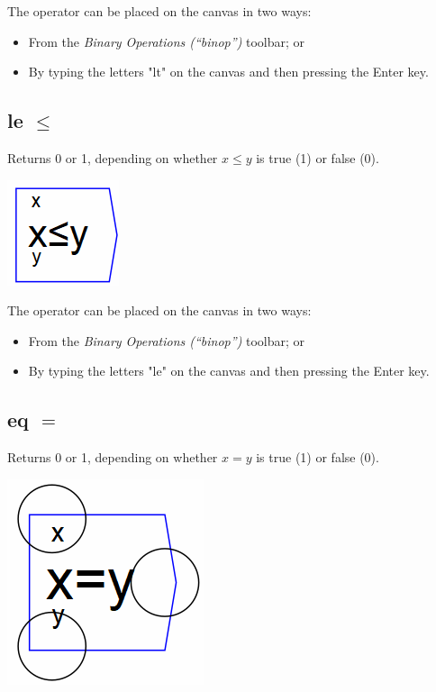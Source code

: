 The operator can be placed on the canvas in two ways:
\begin{itemize}
\item From the \emph{Binary Operations (``binop'')} toolbar; or 
\item By typing the letters "lt" on the canvas and then pressing the Enter
key. 
\end{itemize}

\subsection{le $\le$}

\label{Operation:le} Returns 0 or 1, depending on whether $x\le y$
is true (1) or false (0).

\includegraphics{images/LessEqualKey}

The operator can be placed on the canvas in two ways:
\begin{itemize}
\item From the \emph{Binary Operations (``binop'')} toolbar; or 
\item By typing the letters "le" on the canvas and then pressing the Enter
key. 
\end{itemize}

\subsection{eq $=$}

\label{Operation:eq} Returns 0 or 1, depending on whether $x=y$
is true (1) or false (0).

\includegraphics{images/EqualKey}

